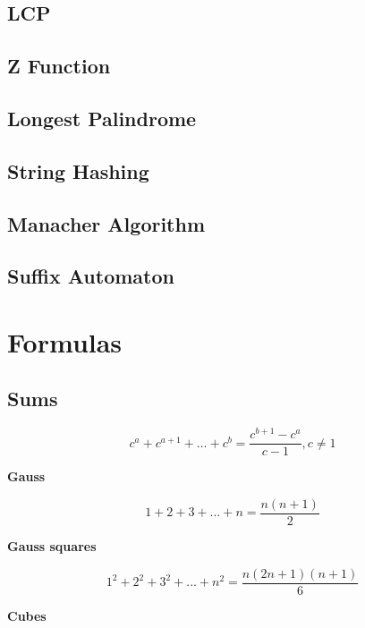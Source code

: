 \documentclass[10pt]{article}
\begin{document}
\begin{multicols*}{2}
\subsection{LCP}


\subsection{Z Function}


\subsection{Longest Palindrome}


\subsection{String Hashing}


\subsection{Manacher Algorithm}


\subsection{Suffix Automaton}

\section{Formulas}

\subsection{Sums}

\[
c^a+c^{a+1}+\dots + c^b = \frac{c^{b+1}-c^a}{c-1}, c\neq 1
\]

\textbf{Gauss}

\[
1+2+3+...+n = \frac{n(n+1)}{2}
\]

\textbf{Gauss squares}

\[
1^2+2^2+3^2+...+n^2 = \frac{n(2n+1)(n+1)}{6}
\]

\textbf{Cubes}


\end{multicols*}
\end{document}
